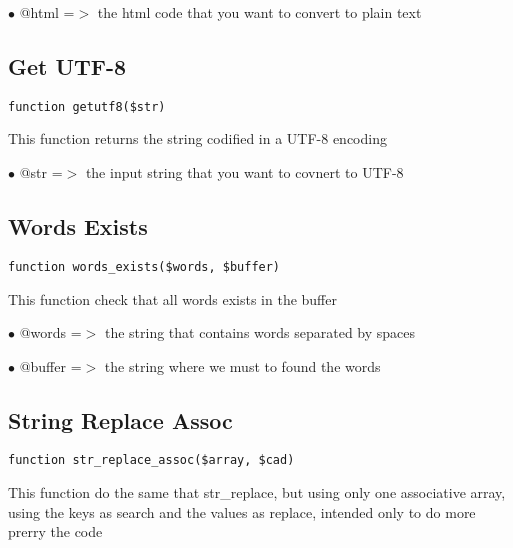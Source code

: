 \documentclass[a4paper]{book}
\begin{document}
\begin{compactitem}
\item[\color{myblue}$\bullet$] @html =$>$ the html code that you want to convert to plain text
\end{compactitem}

\hypertarget{toc274}{}
\subsection{Get UTF-8}

\begin{lstlisting}
function getutf8($str)
\end{lstlisting}

This function returns the string codified in a UTF-8 encoding

\begin{compactitem}
\item[\color{myblue}$\bullet$] @str =$>$ the input string that you want to covnert to UTF-8
\end{compactitem}

\hypertarget{toc275}{}
\subsection{Words Exists}

\begin{lstlisting}
function words_exists($words, $buffer)
\end{lstlisting}

This function check that all words exists in the buffer

\begin{compactitem}
\item[\color{myblue}$\bullet$] @words  =$>$ the string that contains words separated by spaces
\item[\color{myblue}$\bullet$] @buffer =$>$ the string where we must to found the words
\end{compactitem}

\hypertarget{toc276}{}
\subsection{String Replace Assoc}

\begin{lstlisting}
function str_replace_assoc($array, $cad)
\end{lstlisting}

This function do the same that str\_replace, but using only one associative
array, using the keys as search and the values as replace, intended only
to do more prerry the code
\end{document}

